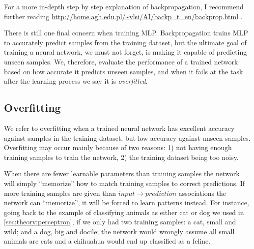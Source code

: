 

For a more in-depth step by step explanation of backpropagation, I recommend further reading \url{http://home.agh.edu.pl/~vlsi/AI/backp_t_en/backprop.html} \cite{Bernacki2005}.

There is still one final concern when training MLP.
Backpropagation trains MLP to accurately predict samples from the training dataset, but the ultimate goal of training a neural network, we must not forget, is making it capable of predicting unseen samples.
We, therefore, evaluate the performance of a trained network based on how accurate it predicts unseen samples, and when it fails at the task after the learning process we say it is \emph{overfitted}.


\subsection{Overfitting}
\label{sec:theory:mlp:overfitting}

We refer to overfitting when a trained neural network has excellent accuracy against samples in the training dataset, but low accuracy against unseen samples.
Overfitting may occur mainly because of two reasons: 1) not having enough training samples to train the network, 2) the training dataset being too noisy.

When there are fewer learnable parameters than training samples the network will simply ``memorize'' how to match training samples to correct predictions.
If more training samples are given than $input \rightarrow prediction$ associations the network can ``memorize'', it will be forced to learn patterns instead.
For instance, going back to the example of classifying animals as either cat or dog we used in \autoref{sec:theory:perceptron}, if we only had two training samples: a cat, small and wild; and a dog, big and docile; the network would wrongly assume all small animals are cats and a chihuahua would end up classified as a feline.

